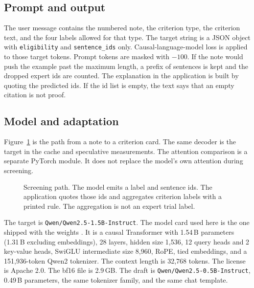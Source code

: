 \documentclass[conference]{IEEEtran}
\begin{document}
\subsection{Prompt and output}
The user message contains the numbered note, the criterion type, the criterion text, and the four labels allowed for that type.
The target string is a JSON object with \texttt{eligibility} and \texttt{sentence\_ids} only.
Causal-language-model loss is applied to those target tokens.
Prompt tokens are masked with $-100$.
If the note would push the example past the maximum length, a prefix of sentences is kept and the dropped expert ids are counted.
The explanation in the application is built by quoting the predicted ids.
If the id list is empty, the text says that an empty citation is not proof.

\subsection{Model and adaptation}
Figure~\ref{fig:workflow} is the path from a note to a criterion card.
The same decoder is the target in the cache and speculative measurements.
The attention comparison is a separate PyTorch module.
It does not replace the model's own attention during screening.

\begin{figure}[t]
\centering
{}
\caption{Screening path. The model emits a label and sentence ids. The application quotes those ids and aggregates criterion labels with a printed rule. The aggregation is not an expert trial label.}
\label{fig:workflow}
\end{figure}

The target is \texttt{Qwen/Qwen2.5-1.5B-Instruct}.
The model card used here is the one shipped with the weights \cite{qwen2025}.
It is a causal Transformer with 1.54\,B parameters (1.31\,B excluding embeddings), 28 layers, hidden size 1{,}536, 12 query heads and 2 key-value heads, SwiGLU intermediate size 8{,}960, RoPE, tied embeddings, and a 151{,}936-token Qwen2 tokenizer.
The context length is 32{,}768 tokens.
The license is Apache 2.0.
The bf16 file is 2.9\,GB.
The draft is \texttt{Qwen/Qwen2.5-0.5B-Instruct}, 0.49\,B parameters, the same tokenizer family, and the same chat template.
\end{document}
